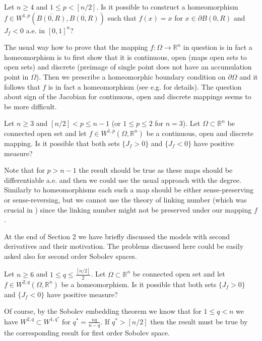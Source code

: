 \documentclass[12pt,a4paper]{amsart}
\theoremstyle{plain}
\theoremstyle{definition}
\numberwithin{equation}{section}
\def\rn{\mathbb R^n}
\newcounter{problem}
\begin{document}
 Let $n\geq 4$ and $1\leq p<[n/2]$. Is it possible to construct a homeomorphism $f\in W^{1,p}(\overline{B(0,R)},\overline{B(0,R)})$ such that $f(x)=x$ for $x\in \partial B(0,R)$ and $J_f<0$ a.e. in $[0,1]^n$? 

\vskip 10pt

The usual way how to prove that the mapping $f:\Omega\to\rn$ in question is in fact a homeomorphism is to first show that it is continuous, open (maps open sets to open sets) and discrete (preimage of single point does not have an accumulation point in $\Omega$). Then we prescribe a homeomorphic boundary condition on $\partial\Omega$ and it follows that $f$ is in fact a homeomorphism (see e.g. \cite[Chapter 3]{HK} for details). The question about sign of the Jacobian for continuous, open and discrete mappings seems to be more difficult. 

 Let $n\geq 3$ and $[n/2]<p\leq n-1$ (or $1\leq p\leq 2$ for $n=3$). Let $\Omega\subset\rn$ be connected open set and let $f\in W^{1,p}(\Omega,\rn)$ be a continuous, open and discrete mapping. Is it possible that both sets $\{J_f>0\}$ and $\{J_f<0\}$ have positive measure? 

Note that for $p>n-1$ the result should be true as these maps should be differentiable a.e. and then we could use the usual approach with the degree. Similarly to homeomorphisms each such a map should be either sense-preserving or sense-reversing, but we cannot use the theory of linking number (which was crucial in \cite{HM}) since the linking number might not be preserved under our mapping $f$. 

\vskip 10pt

At the end of Section 2 we have briefly discussed the models with second derivatives and their motivation. The problems discussed here could be easily asked also for second order Sobolev spaces.  

 Let $n\geq 6$ and $1\leq q\leq \frac{[n/2]}{2}$. Let $\Omega\subset\rn$ be connected open set and let $f\in W^{2,q}(\Omega,\rn)$ be a homeomorphism. Is it possible that both sets $\{J_f>0\}$ and $\{J_f<0\}$ have positive measure? 

Of course, by the Sobolev embedding theorem we know that for $1\leq q<n$ we have $W^{2,q}\subset W^{1,q^*}$ for $q^*=\frac{nq}{n-q}$. If $q^*>[n/2]$ then the result must be true by the corresponding result for first order Sobolev space. 
\end{document}
